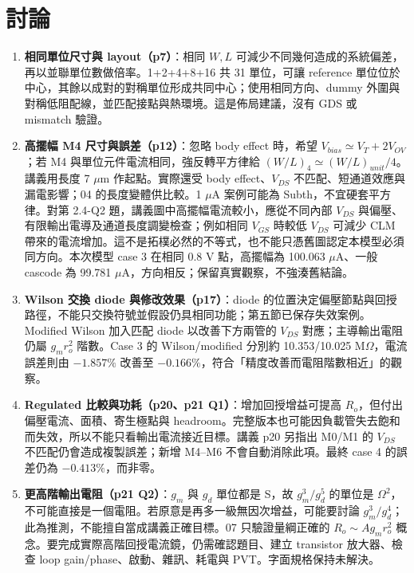 \section{討論}
\begin{enumerate}
\item \textbf{相同單位尺寸與 layout（p7）}：相同 $W,L$ 可減少不同幾何造成的系統偏差，再以並聯單位數做倍率。1+2+4+8+16 共 31 單位，可讓 reference 單位位於中心，其餘以成對的對稱單位形成共同中心；使用相同方向、dummy 外圍與對稱低阻配線，並匹配接點與熱環境。這是佈局建議，沒有 GDS 或 mismatch 驗證。
\item \textbf{高擺幅 M4 尺寸與誤差（p12）}：忽略 body effect 時，希望 $V_{bias}\simeq V_T+2V_{OV}$；若 M4 與單位元件電流相同，強反轉平方律給 $(W/L)_4\simeq(W/L)_{unit}/4$。講義用長度 7 $\mu$m 作起點。實際還受 body effect、$V_{DS}$ 不匹配、短通道效應與漏電影響；04 的長度變體供比較。1 $\mu$A 案例可能為 Subth，不宜硬套平方律。對第 2.4-Q2 題，講義圖中高擺幅電流較小，應從不同內部 $V_{DS}$ 與偏壓、有限輸出電導及通道長度調變檢查；例如相同 $V_{GS}$ 時較低 $V_{DS}$ 可減少 CLM 帶來的電流增加。這不是拓樸必然的不等式，也不能只憑舊圖認定本模型必須同方向。本次模型 case 3 在相同 0.8 V 點，高擺幅為 100.063 $\mu$A、一般 cascode 為 99.781 $\mu$A，方向相反；保留真實觀察，不強湊舊結論。
\item \textbf{Wilson 交換 diode 與修改效果（p17）}：diode 的位置決定偏壓節點與回授路徑，不能只交換符號並假設仍具相同功能；第五節已保存失效案例。Modified Wilson 加入匹配 diode 以改善下方兩管的 $V_{DS}$ 對應；主導輸出電阻仍屬 $g_m r_o^2$ 階數。Case 3 的 Wilson/modified 分別約 10.353/10.025 M$\Omega$，電流誤差則由 $-1.857\%$ 改善至 $-0.166\%$，符合「精度改善而電阻階數相近」的觀察。
\item \textbf{Regulated 比較與功耗（p20、p21 Q1）}：增加回授增益可提高 $R_o$，但付出偏壓電流、面積、寄生極點與 headroom。完整版本也可能因負載管失去飽和而失效，所以不能只看輸出電流接近目標。講義 p20 另指出 M0/M1 的 $V_{DS}$ 不匹配仍會造成複製誤差；新增 M4--M6 不會自動消除此項。最終 case 4 的誤差仍為 $-0.413\%$，而非零。
\item \textbf{更高階輸出電阻（p21 Q2）}：$g_m$ 與 $g_d$ 單位都是 S，故 $g_m^3/g_d^5$ 的單位是 $\Omega^2$，不可能直接是一個電阻。若原意是再多一級無因次增益，可能要討論 $g_m^3/g_d^4$；此為推測，不能擅自當成講義正確目標。07 只驗證量綱正確的 $R_o\sim A g_mr_o^2$ 概念。要完成實際高階回授電流鏡，仍需確認題目、建立 transistor 放大器、檢查 loop gain/phase、啟動、雜訊、耗電與 PVT。字面規格保持未解決。
\end{enumerate}

